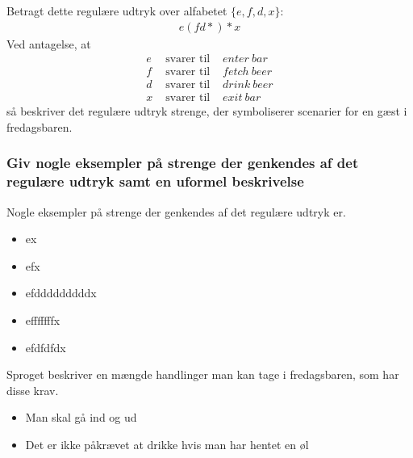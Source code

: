 Betragt dette regulære udtryk over alfabetet $\{e, f, d, x\}$:
\begin{align*}
    e(fd*)*x
\end{align*}
Ved antagelse, at
\begin{align*}
    e & \text{ svarer til } & enter\:bar\\
    f & \text{ svarer til } & fetch\:beer\\
    d & \text{ svarer til } & drink\:beer\\
    x & \text{ svarer til } & exit\:bar
\end{align*}
så beskriver det regulære udtryk strenge, der symboliserer scenarier for en gæst i fredagsbaren.
\subsubsection{Giv nogle eksempler på strenge der genkendes af det regulære udtryk samt en uformel beskrivelse}
Nogle eksempler på strenge der genkendes af det regulære udtryk er.
\begin{itemize}
    \item ex
    \item efx
    \item efdddddddddx
    \item efffffffx
    \item efdfdfdx
\end{itemize}
Sproget beskriver en mængde handlinger man kan tage i fredagsbaren, som har disse krav.
\begin{itemize}
    \item Man skal gå ind og ud
    \item Det er ikke påkrævet at drikke hvis man har hentet en øl
\end{itemize}
